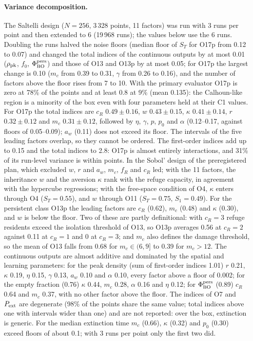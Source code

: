 \paragraph{Variance decomposition.}
The Saltelli design ($N=256$, 3\,328 points, 11 factors) was run with 3 runs per point and then extended to 6
(19\,968 runs); the values below use the 6 runs. Doubling the runs halved the noise floors (median floor of $S_T$ for
O17p from 0.12 to 0.07) and changed the total indices of the continuous outputs by at most 0.01 ($\rho_{\rm pk}$,
$f_0$, $\Phi^{\rm pers}_{\rm BO}$) and those of O13 and O13p by at most 0.05; for O17p the largest change is 0.10
($m_c$ from 0.39 to 0.31, $\gamma$ from 0.26 to 0.16), and the number of factors above the floor rises from 7 to 10.
With the primary evaluator O17p is zero at 78\% of the points and at least 0.8 at 9\% (mean 0.135): the
Calhoun-like region is a minority of the box even with four parameters held at their \textsf{C1} values. For O17p
the total indices are $c_R$ $0.49\pm0.16$, $w$ $0.43\pm0.15$, $\kappa$ $0.41\pm0.14$, $r$ $0.32\pm0.12$ and $m_c$
$0.31\pm0.12$, followed by $\eta$, $\gamma$, $p$, $p_0$ and $\alpha$ (0.12--0.17, against floors of 0.05--0.09); $a_w$
(0.11) does not exceed its floor. The intervals of the five leading factors overlap, so they cannot be ordered. The
first-order indices add up to 0.15 and the total indices to 2.8: O17p is almost entirely interactions, and 31\% of
its run-level variance is within points. In the Sobol' design of the preregistered plan, which excluded $w$, $r$ and
$a_w$, $m_c$, $f_R$ and $c_R$ led; with the 11 factors, the inheritance $w$ and the aversion $\kappa$ rank with the refuge
capacity, in agreement with the hypercube regressions; with the free-space condition of O4, $\kappa$ enters through
O4 ($S_T=0.55$), and $w$ through O11 ($S_T=0.75$, $S_1=0.49$). For the persistent class O13p the leading factors
are $c_R$ (0.62), $m_c$ (0.48) and $\kappa$ (0.30), and $w$ is below the floor. Two of these are partly
definitional: with $c_R=3$ refuge residents exceed the isolation threshold of O13, so O13p averages 0.56 at $c_R=2$
against 0.11 at $c_R=1$ and 0 at $c_R=3$; and $m_c$ also defines the damage threshold, so the mean of O13 falls from
0.68 for $m_c\in(6,9]$ to 0.39 for $m_c>12$.
The continuous outputs are almost additive and dominated by the spatial and learning parameters: for the peak
density (sum of first-order indices 1.01) $r$ 0.21, $\kappa$ 0.19, $\eta$ 0.15, $\gamma$ 0.13, $a_w$ 0.10 and
$\alpha$ 0.10, every factor above a floor of 0.002; for the empty fraction (0.76) $\kappa$ 0.44, $m_c$ 0.28, $\alpha$
0.16 and $\eta$ 0.12; for $\Phi^{\rm pers}_{\rm BO}$ (0.89) $c_R$ 0.64 and $m_c$ 0.37, with no other factor above the
floor. The indices of O7 and $P_{\rm ext}$ are degenerate (98\% of the points share the same value; total indices
above one with intervals wider than one) and are not reported: over the box, extinction is generic. For the median
extinction time $m_c$ (0.66), $\kappa$ (0.32) and $p_0$ (0.30) exceed floors of about 0.1; with 3 runs per point only
the first two did.

